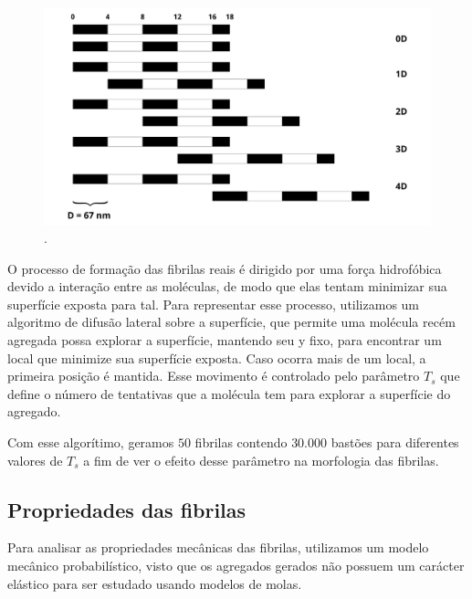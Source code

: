 \documentclass{article}
\begin{document}
        \begin{figure}[H]
            \centering
            \includegraphics[width=\textwidth]{figures/specific_bind.png}
    
            \caption{.} 
    
            \label{M2}
        \end{figure}

        O processo de formação das fibrilas reais é dirigido por uma força hidrofóbica devido a interação entre as moléculas, de modo que elas 
        tentam minimizar sua superfície exposta para tal\cite{Kadler1987,Parkinson1995}. Para representar esse processo, utilizamos um algoritmo
        de difusão lateral sobre a superfície, que permite uma molécula recém agregada possa explorar a superfície, mantendo seu y fixo, para 
        encontrar um local que minimize sua superfície exposta\cite{GarcaRuiz1991}. Caso ocorra mais de um local, a primeira posição é mantida. 
        Esse movimento é controlado pelo parâmetro $T_{s}$ que define o número de tentativas que a molécula tem para explorar a superfície do 
        agregado\cite{Parkinson1995}.
     

        Com esse algorítimo, geramos $50$ fibrilas contendo $30.000$ bastões para diferentes valores de $T_{s}$ a fim de ver o efeito desse 
        parâmetro na morfologia das fibrilas. 


    \subsection{Propriedades das fibrilas}


        
        Para analisar as propriedades mecânicas das fibrilas, utilizamos um modelo mecânico probabilístico, visto que os agregados gerados 
        não possuem um carácter elástico para ser estudado usando modelos de molas\cite{Parkinson1997}. 
\end{document}
